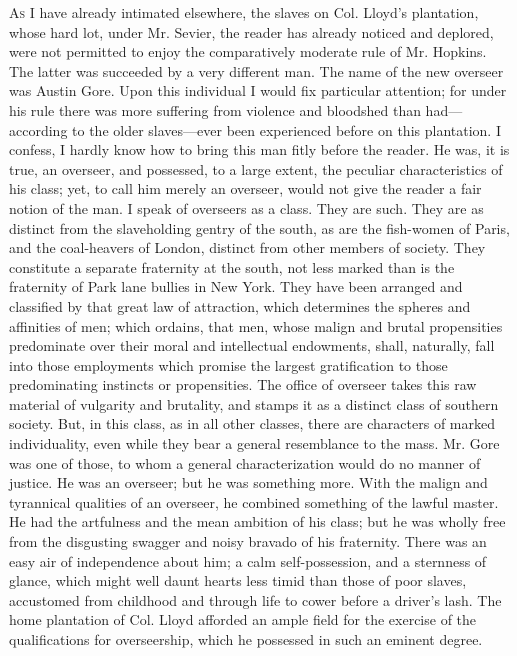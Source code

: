 \textsc{As} I have already intimated elsewhere, the slaves on Col.
Lloyd's plantation, whose hard lot, under Mr. Sevier, the reader has
already noticed and deplored, were not permitted to enjoy the
comparatively moderate rule of Mr. Hopkins. The latter was succeeded by
a very different man. The name of the new overseer was Austin Gore. Upon
this individual I would fix particular attention; for under his rule
there was more suffering from violence and bloodshed than
had---according to the older slaves---ever been experienced before on
this plantation. I confess, I hardly know how to bring this man fitly
before the reader. He was, it is true, an overseer, and possessed, to a
large extent, the peculiar characteristics of his class; yet, to call
him merely an overseer, would not give the reader a fair notion of the
man. I speak of overseers as a class. They are such. They are as
distinct from the slaveholding gentry of the south, as are the
fish-women of Paris, and the coal-heavers of
{\protect\hypertarget{120}{}{}}London, distinct from other members of
society. They constitute a separate fraternity at the south, not less
marked than is the fraternity of Park lane bullies in New York. They
have been arranged and classified by that great law of attraction, which
determines the spheres and affinities of men; which ordains, that men,
whose malign and brutal propensities predominate over their moral and
intellectual endowments, shall, naturally, fall into those employments
which promise the largest gratification to those predominating instincts
or propensities. The office of overseer takes this raw material of
vulgarity and brutality, and stamps it as a distinct class of southern
society. But, in this class, as in all other classes, there are
characters of marked individuality, even while they bear a general
resemblance to the mass. Mr. Gore was one of those, to whom a general
characterization would do no manner of justice. He was an overseer; but
he was something more. With the malign and tyrannical qualities of an
overseer, he combined something of the lawful master. He had the
artfulness and the mean ambition of his class; but he was wholly free
from the disgusting swagger and noisy bravado of his fraternity. There
was an easy air of independence about him; a calm self-possession, and a
sternness of glance, which might well daunt hearts less timid than those
of poor slaves, accustomed from childhood and through life to cower
before a driver's lash. The home plantation of Col. Lloyd afforded an
ample field for the exercise of the qualifications for overseership,
which he possessed in such an eminent degree.

